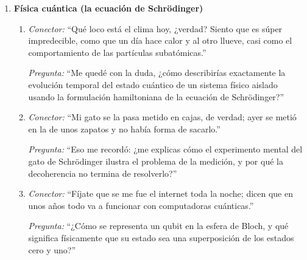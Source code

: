 \begin{enumerate}[label=\textbf{Tema \arabic*.}, wide=0pt, leftmargin=0pt, itemsep=0.6em]
  \item \textbf{Física cuántica (la ecuación de Schrödinger)}
  \begin{enumerate}[label=\alph*), leftmargin=1.8em, itemsep=0.3em]
    \item \textit{Conector:} \enquote{Qué loco está el clima hoy, ¿verdad? Siento que es súper impredecible, como que un día hace calor y al otro llueve, casi como el comportamiento de las partículas subatómicas.}\par
    \textit{Pregunta:} \enquote{Me quedé con la duda, ¿cómo describirías exactamente la evolución temporal del estado cuántico de un sistema físico aislado usando la formulación hamiltoniana de la ecuación de Schrödinger?}
    \item \textit{Conector:} \enquote{Mi gato se la pasa metido en cajas, de verdad; ayer se metió en la de unos zapatos y no había forma de sacarlo.}\par
    \textit{Pregunta:} \enquote{Eso me recordó: ¿me explicas cómo el experimento mental del gato de Schrödinger ilustra el problema de la medición, y por qué la decoherencia no termina de resolverlo?}
    \item \textit{Conector:} \enquote{Fíjate que se me fue el internet toda la noche; dicen que en unos años todo va a funcionar con computadoras cuánticas.}\par
    \textit{Pregunta:} \enquote{¿Cómo se representa un qubit en la esfera de Bloch, y qué significa físicamente que su estado sea una superposición de los estados cero y uno?}
  \end{enumerate}


\end{enumerate}
